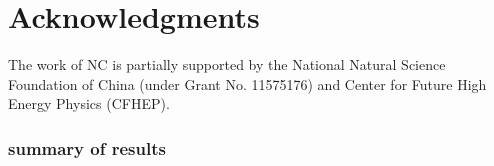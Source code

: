 \documentclass[11pt,aps,prd,showpacs,nofootinbib,superscriptaddress,preprint,preprintnumbers]{revtex4-1}
\begin{document}

\section*{Acknowledgments}



The work of NC is partially supported by the National Natural Science Foundation of China (under Grant No. 11575176) and Center for Future High Energy Physics (CFHEP). 


\newpage


\vspace*{3mm}

\appendix










\subsubsection{summary of results}







\end{document}
